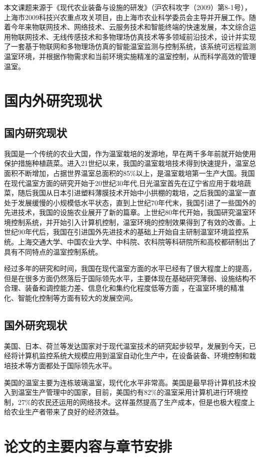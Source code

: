 本文课题来源于《现代农业装备与设施的研发》（沪农科攻字（2009）第8-1号），上海市2009科技兴农重点攻关项目，由上海市农业科学委员会主导并开展工作。随着今年来物联网技术、网络技术、云服务技术和智能终端的快速发展，本文综合运用物联网技术、无线传感技术和多物理场仿真技术等多领域前沿技术，设计并实现了一套基于物联网和多物理场仿真的智能温室监测与控制系统，该系统可远程监测温室环境，并根据作物需求和当前环境实施精准的温室控制，从而科学高效的管理温室。
\section{国内外研究现状}
	\subsection{国内研究现状}
	我国是一个传统的农业大国，作为温室栽培的发源地，早在两千多年前就开始使用保护措施种植蔬菜。进入21世纪以来，我国的温室栽培技术得到快速提升，温室总面积不断增加，占据世界温室总面积的85\%以上，是温室栽培第一生产大国\supercite{WoGuoSheShiNongYe}。我国在现代温室方面的研究开始于20世纪30年代,日光温室首先在辽宁省应用于栽培蔬菜，随后我国从日本引进塑料薄膜技术开始中小拱棚的栽培，之后我国的温室一直处于发展缓慢的小规模低水平状态，直到上世纪70年代末，我国引进了一些国外的先进技术，我国的设施农业展开了新的篇章\supercite{xiandaiwenshi}。上世纪80年代开始，我国研究温室环境控制系统，并开始引入计算机控制，温室环境的控制效果得到了有效的改善\supercite{HanYi2016}。上世纪90年代后，我国在引进国外先进技术的基础上开始自主研制温室环境监控系统。上海交通大学、中国农业大学、中科院、农科院等科研院所和高校都研制出了具有不同特点的温室控制系统。
	
	经过多年的研究和时间，我国在现代温室方面的水平已经有了很大程度上的提高，但是在很多方面仍然落后于国际领先水平，主要体现在基础研究薄弱、设施结构不合理、装备和调控能力差、信息化和集约化程度低等方面\supercite{ZhangZhen2015,JiangWeijie2015} ，在温室环境的精准化、智能化控制等方面有较大的发展空间。
	\subsection{国外研究现状}
	美国、日本、荷兰等发达国家对于现代温室技术的研究起步较早，发展到今天，已经将计算机监控系统大规模应用到温室自动化生产中，在设备装备、环境控制和栽培技术等方面都处于国际领先水平。
	
	美国的温室主要为连栋玻璃温室，现代化水平非常高。美国是最早将计算机技术投入到温室生产管理中的国家，目前，美国约有82\%的温室采用计算机进行环境控制，27\%的农民还运用的网络技术\supercite{Kacira2011}。这样虽然提高了生产成本，但是也极大程度上给农业生产者带来了良好的经济效益\supercite{GuoShirong2012}。
\section{论文的主要内容与章节安排}
